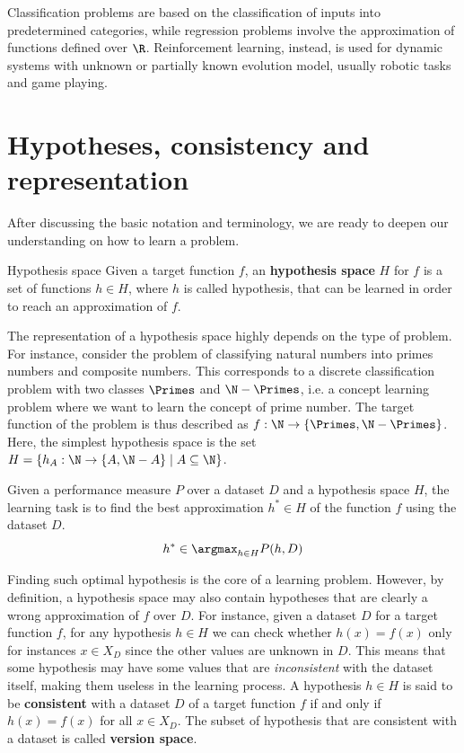 \documentclass[a4paper, 12pt]{report}
\begin{document}
    Classification problems are based on the classification of inputs into predetermined categories, while regression problems involve the approximation of functions defined over $\R$. Reinforcement learning, instead, is used for dynamic systems with unknown or partially known evolution model, usually robotic tasks and game playing. 
    
    \newpage

    \section{Hypotheses, consistency and representation}

    After discussing the basic notation and terminology, we are ready to deepen our understanding on how to learn a problem.
    
    \begin{frameddefn}{Hypothesis space}
        Given a target function $f$, an \textbf{hypothesis space} $H$ for $f$ is a set of functions $h \in H$, where $h$ is called hypothesis, that can be learned in order to reach an approximation of $f$.
    \end{frameddefn}

    The representation of a hypothesis space highly depends on the type of problem. For instance, consider the problem of classifying natural numbers into primes numbers and composite numbers. This corresponds to a discrete classification problem with two classes $\Primes$ and $\N-\Primes$, i.e. a concept learning problem where we want to learn the concept of prime number. The target function of the problem is thus described as $f : \N \to \{\Primes,\N-\Primes\}$. Here, the simplest hypothesis space is the set $H = \{h_A : \N \to \{A, \N-A\} \mid A \subseteq \N\}$.

    Given a performance measure $P$ over a dataset $D$ and a hypothesis space $H$, the learning task is to find the best approximation $h^* \in H$ of the function $f$ using the dataset $D$.
    \[h^* \in \argmax_{h \in H} P(h,D)\]

    Finding such optimal hypothesis is the core of a learning problem. However, by definition, a hypothesis space may also contain hypotheses that are clearly a wrong approximation of $f$ over $D$. For instance, given a dataset $D$ for a target function $f$, for any hypothesis $h \in H$ we can check whether $h(x) = f(x)$ only for instances $x \in X_D$ since the other values are unknown in $D$. This means that some hypothesis may have some values that are \textit{inconsistent} with the dataset itself, making them useless in the learning process. A hypothesis $h \in H$ is said to be \textbf{consistent} with a dataset $D$ of a target function $f$ if and only if $h(x) = f(x)$ for all $x \in X_D$. The subset of hypothesis that are consistent with a dataset is called \textbf{version space}. 
\end{document}
